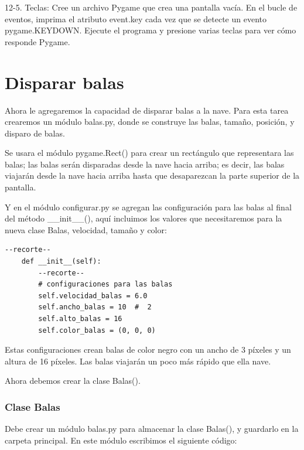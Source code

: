 12-5. Teclas: 
Cree un archivo Pygame que crea una pantalla vacía. En el bucle de eventos, imprima el atributo event.key cada vez que se detecte un evento pygame.KEYDOWN. Ejecute el programa y presione varias teclas para ver cómo responde Pygame.



\section{Disparar balas}

Ahora le agregaremos la capacidad de disparar balas a la nave. Para esta tarea crearemos un módulo {\ttfamily balas.py}, donde se construye las balas, tamaño, posición, y disparo de balas. 

Se usara  el módulo {\ttfamily  pygame.Rect()} para crear un rectángulo que representara las balas;  las balas serán disparadas desde la nave hacia arriba; es decir, las balas viajarán desde la nave hacia arriba hasta que desaparezcan la parte superior de la pantalla.

Y en el módulo  {\ttfamily configurar.py} se agregan las configuración para las balas al final del método {\ttfamily \_\_init\_\_()},  aquí  incluimos los valores que necesitaremos para la nueva clase {\ttfamily Balas}, velocidad, tamaño y color:

\hspace{-2.75cm}{\ttfamily \scriptsize configurar.py}  \vspace{-0.5cm}
\begin{lstlisting}	
--recorte--	
    def __init__(self):
        --recorte--
        # configuraciones para las balas
        self.velocidad_balas = 6.0
        self.ancho_balas = 10  #  2
        self.alto_balas = 16
        self.color_balas = (0, 0, 0)
\end{lstlisting}
Estas configuraciones crean balas de color negro con un ancho de 3 píxeles y un altura de 16 píxeles. Las balas viajarán un poco más rápido que ella nave.

Ahora debemos crear la clase  {\ttfamily Balas()}.
\subsubsection*{Clase Balas}

Debe crear un módulo {\ttfamily balas.py} para almacenar la clase {\ttfamily Balas()}, y guardarlo en la carpeta principal. En este módulo  escribimos el siguiente código:

